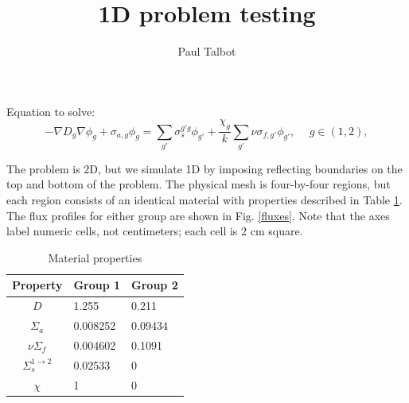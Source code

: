 \documentclass[11pt]{article} %
\title{1D problem testing}
\author{Paul Talbot}
\begin{document}
\maketitle

Equation to solve:
\begin{equation}
-\nabla D_g\nabla\phi_g+\sigma_{a,g}\phi_g=\sum_{g'}\sigma_s^{g'g}\phi_{g'}+\frac{\chi_g}{k}\sum_{g'}\nu\sigma_{f,g'}\phi_{g'}, \hspace{15pt}g\in(1,2),
\end{equation}

The problem is 2D, but we simulate 1D by imposing reflecting boundaries on the top and bottom of the problem.  The physical mesh is four-by-four regions, but each region consists of an identical material with properties described in Table \ref{matprops}.  The flux profiles for either group are shown in Fig. \ref{fluxes}.  Note that the axes label numeric cells, not centimeters; each cell is 2 cm square.
\begin{table}
\begin{center}
\begin{tabular}{c|l l}
Property & Group 1 & Group 2 \\ \hline
$D$ & 1.255 & 0.211\\
$\Sigma_a$ & 0.008252 & 0.09434\\
$\nu\Sigma_f$ & 0.004602 & 0.1091\\
$\Sigma^{1\to2}_s$ & 0.02533 & 0\\
$\chi$ & 1 & 0\\
\end{tabular}
\caption{Material properties}
\label{matprops}
\end{center}
\end{table}
\end{document}
